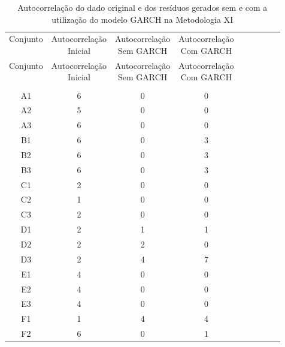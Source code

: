 \begin{center}
\begin{longtable}{ccccc|cccc}
\toprule
\rowcolor{white}
\caption[Metodologia XI: evolução da autocorrelação]{Autocorrelação do dado
original e dos resíduos gerados sem e com a utilização do modelo GARCH na
Metodologia XI} \label{tab:EvolucaoAutocorrelacaoMet11}\\
\midrule
Conjunto & \specialcell{Autocorrelação\\Inicial} & \specialcell{Autocorrelação\\Sem
GARCH} & \specialcell{Autocorrelação\\Com GARCH} \\
\midrule
\endfirsthead 
\midrule
\rowcolor{white}
Conjunto & \specialcell{Autocorrelação\\Inicial} & \specialcell{Autocorrelação\\Sem
GARCH} & \specialcell{Autocorrelação\\Com GARCH} \\
\toprule
\endhead
\midrule \\ %
\endfoot
\bottomrule 
\endlastfoot
    A1    & 6     & 0     & 0 \\
    A2    & 5     & 0     & 0 \\
    A3    & 6     & 0     & 0 \\
    B1    & 6     & 0     & 3 \\
    B2    & 6     & 0     & 3 \\
    B3    & 6     & 0     & 3 \\
    C1    & 2     & 0     & 0 \\
    C2    & 1     & 0     & 0 \\
    C3    & 2     & 0     & 0 \\
    D1    & 2     & 1     & 1 \\
    D2    & 2     & 2     & 0 \\
    D3    & 2     & 4     & 7 \\
    E1    & 4     & 0     & 0 \\
    E2    & 4     & 0     & 0 \\
    E3    & 4     & 0     & 0 \\
    F1    & 1     & 4     & 4 \\
    F2    & 6     & 0     & 1 \\

\end{longtable}
\end{center}
